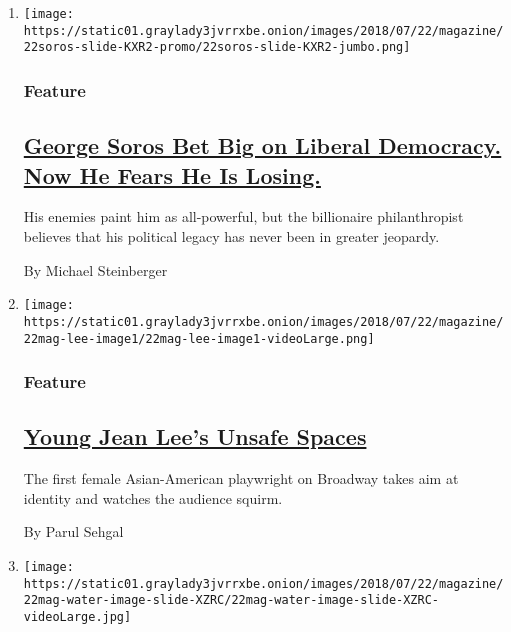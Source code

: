 \begin{enumerate}
\def\labelenumi{\arabic{enumi}.}
\item
  \texttt{[image: https://static01.graylady3jvrrxbe.onion/images/2018/07/22/magazine/22soros-slide-KXR2-promo/22soros-slide-KXR2-jumbo.png]}

  \hypertarget{feature}{%
  \subsubsection{Feature}\label{feature}}

  \hypertarget{george-soros-bet-big-on-liberal-democracy-now-he-fears-he-is-losing}{%
  \subsection{\texorpdfstring{\href{/2018/07/17/magazine/george-soros-democrat-open-society.html}{George
  Soros Bet Big on Liberal Democracy. Now He Fears He Is
  Losing.}}{George Soros Bet Big on Liberal Democracy. Now He Fears He Is Losing.}}\label{george-soros-bet-big-on-liberal-democracy-now-he-fears-he-is-losing}}

  His enemies paint him as all-powerful, but the billionaire
  philanthropist believes that his political legacy has never been in
  greater jeopardy.

  By Michael Steinberger
\item
  \texttt{[image: https://static01.graylady3jvrrxbe.onion/images/2018/07/22/magazine/22mag-lee-image1/22mag-lee-image1-videoLarge.png]}

  \hypertarget{feature-1}{%
  \subsubsection{Feature}\label{feature-1}}

  \hypertarget{young-jean-lees-unsafe-spaces}{%
  \subsection{\texorpdfstring{\href{/2018/07/18/magazine/young-jean-lees-unsafe-spaces.html}{Young
  Jean Lee's Unsafe
  Spaces}}{Young Jean Lee's Unsafe Spaces}}\label{young-jean-lees-unsafe-spaces}}

  The first female Asian-American playwright on Broadway takes aim at
  identity and watches the audience squirm.

  By Parul Sehgal
\item
  \texttt{[image: https://static01.graylady3jvrrxbe.onion/images/2018/07/22/magazine/22mag-water-image-slide-XZRC/22mag-water-image-slide-XZRC-videoLarge.jpg]}


\end{enumerate}
